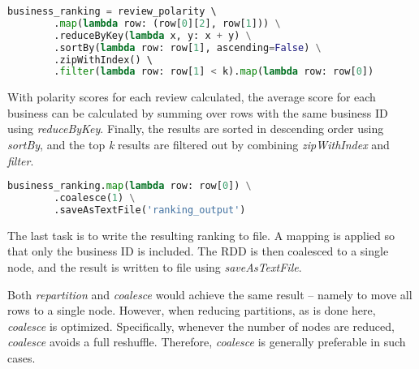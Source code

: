 \documentclass[a4paper]{article}
\begin{document}
\begin{lstlisting}[language=python]
    business_ranking = review_polarity \ 
        .map(lambda row: (row[0][2], row[1])) \
        .reduceByKey(lambda x, y: x + y) \
        .sortBy(lambda row: row[1], ascending=False) \
        .zipWithIndex() \ 
        .filter(lambda row: row[1] < k).map(lambda row: row[0])
\end{lstlisting}

With polarity scores for each review calculated, the average score for each business can be calculated by summing over rows with the same business ID using \emph{reduceByKey}. Finally, the results are sorted in descending order using \emph{sortBy}, and the top \emph{k} results are filtered out by combining \emph{zipWithIndex} and \emph{filter}.

\begin{lstlisting}[language=python]
    business_ranking.map(lambda row: row[0]) \
        .coalesce(1) \
        .saveAsTextFile('ranking_output')
\end{lstlisting}

The last task is to write the resulting ranking to file. A mapping is applied so that only the business ID is included. The RDD is then coalesced to a single node, and the result is written to file using \emph{saveAsTextFile}.

Both \emph{repartition} and \emph{coalesce} would achieve the same result -- namely to move all rows to a single node. However, when reducing partitions, as is done here, \emph{coalesce} is optimized. Specifically, whenever the number of nodes are reduced, \emph{coalesce} avoids a full reshuffle. Therefore, \emph{coalesce} is generally preferable in such cases.
\end{document}
